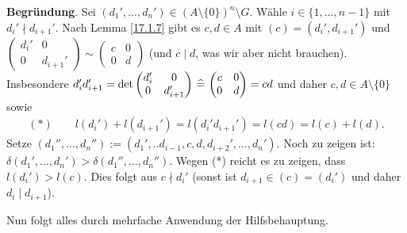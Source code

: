 \documentclass[../../main.tex]{subfiles}
\begin{document}
\begin{cproof}
\begin{tcolorbox}[arc=0mm, boxrule=0.2mm]
\noindent\textbf{Begründung}. Sei $(d_1',...,d_n')\in (A\setminus\{0\})^n\setminus G$. Wähle $i\in\{1,...,n-1\}$ mit $d_i'\nmid d_{i+1}'$. Nach Lemma \ref{17.1.7} gibt es $c,d\in A$ mit $(c)=(d_i',d_{i+1}')$ und $\begin{pmatrix*}d_i'&0\\ 0&d_{i+1}'\end{pmatrix*}\sim\begin{pmatrix*}c&0\\ 0&d\end{pmatrix*}$ (und $c\mid d$, was wir aber nicht brauchen). Insbesondere $d_i'd_{i+1}'=\det\begin{pmatrix*}d_i'&0\\ 0&d_{i+1}'\end{pmatrix*}\divi\begin{pmatrix*}c&0\\ 0&d\end{pmatrix*}=cd$ und daher $c,d\in A\setminus\{0\}$ sowie
\begin{align*}
(*)\qquad l(d_i')+l(d_{i+1}')=l(d_i'd_{i+1}')=l(cd)=l(c)+l(d).
\end{align*}
Setze $(d_1'',...,d_n''):=(d_1',..d_{i-1},c,d,d_{i+2}',...,d_n')$. Noch zu zeigen ist: $\delta(d_1',...,d_n')>\delta(d_1'',...,d_n'')$. Wegen (*) reicht es zu zeigen, dass $l(d_i')>l(c)$. Dies folgt aus $c\nmid d_i'$ (sonst ist $d_{i+1}\in (c)=(d_i')$ und daher $d_i\mid d_{i+1}$).\end{tcolorbox}

\noindent Nun folgt alles durch mehrfache Anwendung der Hilfsbehauptung.
\end{cproof}
\end{document}
